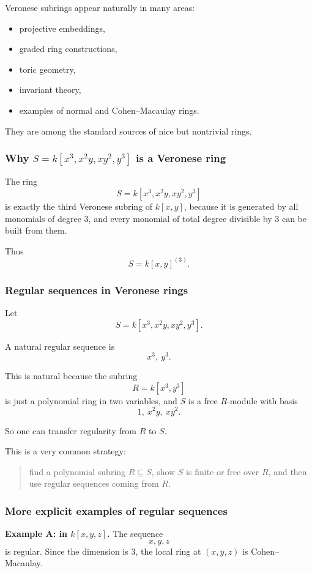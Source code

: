 \documentclass[12pt,a4paper]{article}
\theoremstyle{notespace}
\begin{document}
Veronese subrings appear naturally in many areas:
\begin{itemize}
	\item projective embeddings,
	\item graded ring constructions,
	\item toric geometry,
	\item invariant theory,
	\item examples of normal and Cohen--Macaulay rings.
\end{itemize}

They are among the standard sources of nice but nontrivial rings.

\subsubsection{Why \(S=k[x^3,x^2y,xy^2,y^3]\) is a Veronese ring}

The ring
\[
S=k[x^3,x^2y,xy^2,y^3]
\]
is exactly the third Veronese subring of \(k[x,y]\), because it is generated by all monomials of degree \(3\), and every monomial of total degree divisible by \(3\) can be built from them.

Thus
\[
S=k[x,y]^{(3)}.
\]

\subsubsection{Regular sequences in Veronese rings}

Let
\[
S=k[x^3,x^2y,xy^2,y^3].
\]

A natural regular sequence is
\[
x^3,\ y^3.
\]

This is natural because the subring
\[
R=k[x^3,y^3]
\]
is just a polynomial ring in two variables, and \(S\) is a free \(R\)-module with basis
\[
1,\ x^2y,\ xy^2.
\]

So one can transfer regularity from \(R\) to \(S\).

This is a very common strategy:
\begin{quote}
	find a polynomial subring \(R\subseteq S\), show \(S\) is finite or free over \(R\), and then use regular sequences coming from \(R\).
\end{quote}

\subsubsection{More explicit examples of regular sequences}

\textbf{Example A: in \(k[x,y,z]\).}
The sequence
\[
x,y,z
\]
is regular. Since the dimension is \(3\), the local ring at \((x,y,z)\) is Cohen--Macaulay.
\end{document}
